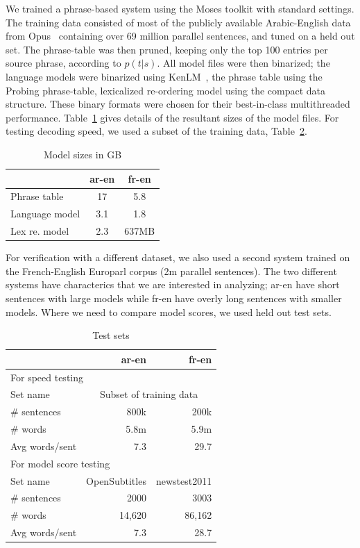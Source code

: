 \documentclass[]{article}
\begin{document}
We trained a phrase-based system using the Moses toolkit with standard settings. The training data consisted of most of the publicly available Arabic-English data from Opus~\citep{tiedemann2012parallel} containing over 69 million parallel sentences, and tuned on a held out set. The phrase-table was then pruned, keeping only the top 100 entries per source phrase, according to $p(t|s)$. All model files were then binarized; the language models were binarized using KenLM~\citep{Heafield-kenlm}, the phrase table using the Probing phrase-table, lexicalized re-ordering model using the compact data structure. These binary formats were chosen for their best-in-class multithreaded performance. Table~\ref{tab:model-files} gives details of the resultant sizes of the model files. For testing decoding speed, we used a subset of the training data, Table~\ref{tab:test-sets}. 
\begin{table}[h]
\begin{center}
\begin{tabular}{|l|c|c|} \hline
		& ar-en	& fr-en \\ \hline
Phrase table  	& 17 	& 5.8 \\
Language model 	& 3.1  	& 1.8 \\ 
Lex re. model	& 2.3	& 637MB \\ \hline
\end{tabular}
\end{center}
\caption{Model sizes in GB}
\label{tab:model-files}
\end{table}

For verification with a different dataset, we also used a second system trained on the French-English Europarl corpus (2m parallel sentences). The two different systems have characterics that we are interested in analyzing; ar-en have short sentences with large models while fr-en have overly long sentences with smaller models. Where we need to compare model scores, we used held out test sets.

\begin{table}[h]
\begin{center}
\small
\begin{tabular}{|l|r|r|} \hline
		& ar-en		& fr-en \\ \hline
\multicolumn{3}{|l|}{For speed testing} \\ \hline
Set name	& \multicolumn{2}{|c|}{Subset of training data} \\
\# sentences  	& 800k 		& 200k \\
\# words 	& 5.8m 		& 5.9m \\ 
Avg words/sent	& 7.3		& 29.7 \\ \hline
\multicolumn{3}{|l|}{For model score testing} \\ \hline
Set name	& OpenSubtitles	& newstest2011 \\
\# sentences  	& 2000 		& 3003 \\
\# words 	& 14,620 	& 86,162 \\ 
Avg words/sent	& 7.3		& 28.7 \\ \hline
\end{tabular}
\end{center}
\caption{Test sets}
\label{tab:test-sets}
\end{table}
\end{document}
